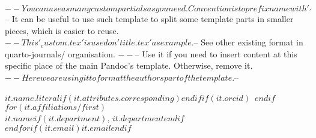 $-- You can use as many custom partials as you need. Convention is to prefix name with '_'
$-- It can be useful to use such template to split some template parts in smaller pieces, which is easier to reuse. 
$-- This '_custom.tex' is used on 'title.tex' as example.
$-- See other existing format in quarto-journals/ organisation.
$-- %
$-- Use it if you need to insert content at this specific place of the main Pandoc's template. Otherwise, remove it.
$-- Here we are using it to format the authors part of the template.
$-- %

$it.name.literal$$if(it.attributes.corresponding)$$endif$$if(it.orcid)$~$endif$$for(it.affiliations/first)$\\$it.name$$if(it.department)$, $it.department$$endif$\\$endfor$$if(it.email)$\href{mailto:$it.email$}{$it.email$}$endif$
